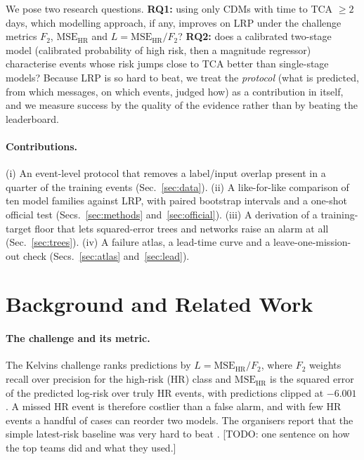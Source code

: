 \documentclass[clean,twocolumn]{bam-proposal}
\newcommand{\todo}[1]{{\color{red}[TODO: #1]}}
\newcommand{\MSEHR}{\mathrm{MSE}_{\mathrm{HR}}}
\begin{document}
We pose two research questions.
\textbf{RQ1:} using only CDMs with time to TCA $\ge 2$ days, which modelling approach, if any, improves on LRP under the challenge metrics $F_2$, $\MSEHR$ and $L=\MSEHR/F_2$?
\textbf{RQ2:} does a calibrated two-stage model (calibrated probability of high risk, then a magnitude regressor) characterise events whose risk jumps close to TCA better than single-stage models?
Because LRP is so hard to beat, we treat the \emph{protocol} (what is predicted, from which messages, on which events, judged how) as a contribution in itself, and we measure success by the quality of the evidence rather than by beating the leaderboard.

\paragraph{Contributions.}
(i) An event-level protocol that removes a label/input overlap present in a quarter of the training events (Sec.~\ref{sec:data}). (ii) A like-for-like comparison of ten model families against LRP, with paired bootstrap intervals and a one-shot official test (Secs.~\ref{sec:methods} and~\ref{sec:official}). (iii) A derivation of a training-target floor that lets squared-error trees and networks raise an alarm at all (Sec.~\ref{sec:trees}). (iv) A failure atlas, a lead-time curve and a leave-one-mission-out check (Secs.~\ref{sec:atlas} and~\ref{sec:lead}).

\section{Background and Related Work}\label{sec:background}

\paragraph{The challenge and its metric.}
The Kelvins challenge ranks predictions by $L=\MSEHR/F_2$, where $F_2$ weights recall over precision for the high-risk (HR) class and $\MSEHR$ is the squared error of the predicted log-risk over truly HR events, with predictions clipped at $-6.001$ \citep{uriot2021collision}. A missed HR event is therefore costlier than a false alarm, and with few HR events a handful of cases can reorder two models. The organisers report that the simple latest-risk baseline was very hard to beat \citep{uriot2021collision}. \todo{one sentence on how the top teams did and what they used.}
\end{document}
